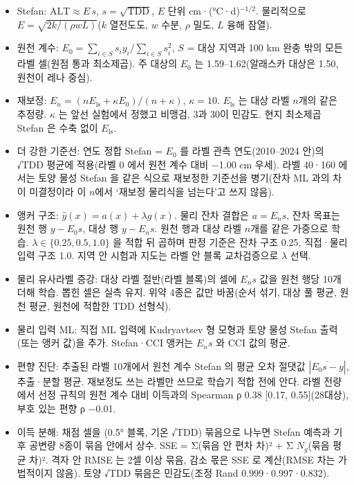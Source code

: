 \begin{itemize}[leftmargin=1.4em, itemsep=0.15em]
  \item Stefan: $\mathrm{ALT} \approx E\,s$, $s=\sqrt{\mathrm{TDD}}$, $E$ 단위 cm·(°C·d)$^{-1/2}$. 물리적으로 $E=\sqrt{2k/(\rho w L)}$($k$ 열전도도, $w$ 수분, $\rho$ 밀도, $L$ 융해 잠열).
  \item 원천 계수: $E_0 = \sum_{i\in S} s_i y_i / \sum_{i \in S} s_i^2$, $S$ = 대상 지역과 100 km 완충 밖의 모든 라벨 셀(원점 통과 최소제곱). 주 대상의 $E_0$ 는 1.59–1.62(알래스카 대상은 1.50, 원천이 레나 중심).
  \item 재보정: $E_n = (n E_{\mathrm{ls}} + \kappa E_0)/(n+\kappa)$, $\kappa = 10$. $E_{\mathrm{ls}}$ 는 대상 라벨 $n$개의 같은 추정량. $\kappa$ 는 앞선 실험에서 정했고 비맹검, 3과 30이 민감도. 현지 최소제곱 Stefan 은 수축 없이 $E_{\mathrm{ls}}$.
  \item 더 강한 기준선: 연도 정합 Stefan = $E_0$ 를 라벨 관측 연도(2010–2024 안)의 √TDD 평균에 적용(라벨 0 에서 원천 계수 대비 −1.00 cm 우세). 라벨 40·160 에서는 토양 물성 Stefan 을 같은 식으로 재보정한 기준선을 병기(잔차 ML 과의 차이 미결정이라 이 $n$에서 ‘재보정 물리식을 넘는다’고 쓰지 않음).
  \item 앵커 구조: $\hat{y}(x) = a(x) + \lambda g(x)$. 물리 잔차 결합은 $a = E_n s$, 잔차 목표는 원천 행 $y - E_0 s$, 대상 행 $y - E_n s$. 원천 행과 대상 라벨 $n$개를 같은 가중으로 학습. $\lambda \in \{0.25, 0.5, 1.0\}$ 을 적합 뒤 곱하며 판정 기준은 잔차 구조 0.25, 직접·물리 입력 구조 1.0. 지역 안 시험과 지도는 라벨 안 블록 교차검증으로 $\lambda$ 선택.
  \item 물리 유사라벨 증강: 대상 라벨 절반(라벨 블록)의 셀에 $E_n s$ 값을 원천 행당 10개 더해 학습. 뽑힌 셀은 실측 유지. 위약 4종은 값만 바꿈(순서 섞기, 대상 풀 평균, 원천 평균, 원천에 적합한 TDD 선형식).
  \item 물리 입력 ML: 직접 ML 입력에 Kudryavtsev 형 모형과 토양 물성 Stefan 출력(또는 앵커 값)을 추가. Stefan·CCI 앵커는 $E_n s$ 와 CCI 값의 평균.
  \item 편향 진단: 추출된 라벨 10개에서 원천 계수 Stefan 의 평균 오차 절댓값 $|\overline{E_0 s - y}|$, 추출·분할 평균. 재보정도 쓰는 라벨만 쓰므로 학습기 적합 전에 안다. 라벨 전량에서 선정 규칙의 원천 계수 대비 이득과의 Spearman ρ 0.38 [0.17, 0.55](28대상), 부호 있는 편향 ρ −0.01.
  \item 이득 분해: 채점 셀을 (0.5° 블록, 기온 √TDD) 묶음으로 나누면 Stefan 예측과 기후 공변량 8종이 묶음 안에서 상수. SSE = Σ(묶음 안 편차 차)² + Σ $N_g$(묶음 평균 차)². 격자 안 RMSE 는 2셀 이상 묶음, 감소 몫은 SSE 로 계산(RMSE 차는 가법적이지 않음). 토양 √TDD 묶음은 민감도(조정 Rand 0.999·0.997·0.832).
\end{itemize}

